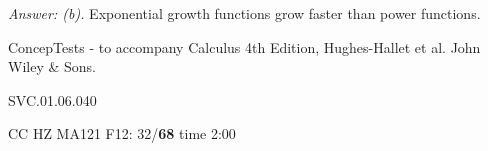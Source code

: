 {\it Answer: (b).} Exponential growth functions grow faster than power functions.

\medskip
ConcepTests - to accompany Calculus 4th Edition, Hughes-Hallet et al. John Wiley \& Sons.

SVC.01.06.040


CC HZ MA121 F12: 32/{\bf68} time 2:00  \\
